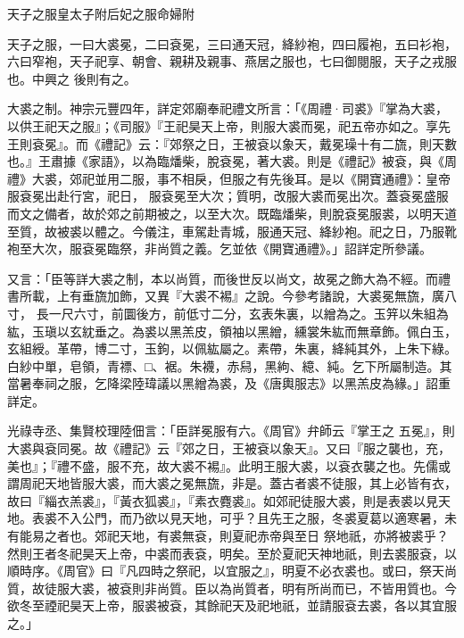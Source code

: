 
\begin{pinyinscope}

 天子之服皇太子附后妃之服命婦附



 天子之服，一曰大裘冕，二曰袞冕，三曰通天冠，絳紗袍，四曰履袍，五曰衫袍，六曰窄袍，天子祀享、朝會、親耕及親事、燕居之服也，七曰御閱服，天子之戎服也。中興之
 後則有之。



 大裘之制。神宗元豐四年，詳定郊廟奉祀禮文所言：「《周禮·司裘》『掌為大裘，以供王祀天之服』；《司服》『王祀昊天上帝，則服大裘而冕，祀五帝亦如之。享先王則袞冕』。而《禮記》云：『郊祭之日，王被袞以象天，戴冕璪十有二旒，則天數也。』王肅據《家語》，以為臨燔柴，脫袞冕，著大裘。則是《禮記》被袞，與《周禮》大裘，郊祀並用二服，事不相戾，但服之有先後耳。是以《開寶通禮》：皇帝服袞冕出赴行宮，祀日，
 服袞冕至大次；質明，改服大裘而冕出次。蓋袞冕盛服而文之備者，故於郊之前期被之，以至大次。既臨燔柴，則脫袞冕服裘，以明天道至質，故被裘以體之。今儀注，車駕赴青城，服通天冠、絳紗袍。祀之日，乃服靴袍至大次，服袞冕臨祭，非尚質之義。乞並依《開寶通禮》。」詔詳定所參議。



 又言：「臣等詳大裘之制，本以尚質，而後世反以尚文，故冕之飾大為不經。而禮書所載，上有垂旒加飾，又異『大裘不裼』之說。今參考諸說，大裘冕無旒，廣八寸，
 長一尺六寸，前圜後方，前低寸二分，玄表朱裏，以繒為之。玉笄以朱組為紘，玉瑱以玄紞垂之。為裘以黑羔皮，領袖以黑繒，纁裳朱紘而無章飾。佩白玉，玄組綬。革帶，博二寸，玉鉤，以佩紘屬之。素帶，朱裏，絳純其外，上朱下綠。白紗中單，皂領，青褾、□、裾。朱襪，赤舄，黑絇、繶、純。乞下所屬制造。其當暑奉祠之服，乞降梁陸瑋議以黑繒為裘，及《唐輿服志》以黑羔皮為緣。」詔重詳定。



 光祿寺丞、集賢校理陸佃言：「臣詳冕服有六。《周官》弁師云『掌王之
 五冕』，則大裘與袞同冕。故《禮記》云『郊之日，王被袞以象天』。又曰『服之襲也，充，美也』；『禮不盛，服不充，故大裘不裼』。此明王服大裘，以袞衣襲之也。先儒或謂周祀天地皆服大裘，而大裘之冕無旒，非是。蓋古者裘不徒服，其上必皆有衣，故曰『緇衣羔裘』，『黃衣狐裘』，『素衣麑裘』。如郊祀徒服大裘，則是表裘以見天地。表裘不入公門，而乃欲以見天地，可乎？且先王之服，冬裘夏葛以適寒暑，未有能易之者也。郊祀天地，有裘無袞，則夏祀赤帝與至日
 祭地祇，亦將被裘乎？然則王者冬祀昊天上帝，中裘而表袞，明矣。至於夏祀天神地祇，則去裘服袞，以順時序。《周官》曰『凡四時之祭祀，以宜服之』，明夏不必衣裘也。或曰，祭天尚質，故徒服大裘，被袞則非尚質。臣以為尚質者，明有所尚而已，不皆用質也。今欲冬至禋祀昊天上帝，服裘被袞，其餘祀天及祀地祇，並請服袞去裘，各以其宜服之。」




\end{pinyinscope}
